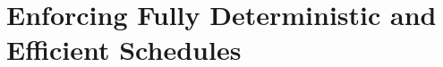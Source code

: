 
\newcommand{\bddbddb}{\vv{bddbddb}\xspace}
\newcommand{\peregrinenprog}[0]{18\xspace}

\chapter{Enforcing Fully Deterministic and Efficient Schedules} \label{sec:peregrine}












